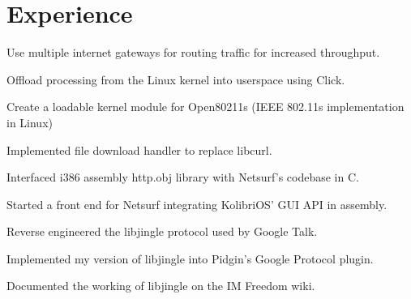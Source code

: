 \documentclass[letterpaper]{deedy-resume} %
\begin{document}
\begin{minipage}[t]{0.66\textwidth} %
\section{Experience}
\vspace{\topsep} %
\begin{tightitemize}
\item Use multiple internet gateways for routing traffic for increased throughput.
\item Offload processing from the Linux kernel into userspace using Click.
\item Create a loadable kernel module for Open80211s (IEEE 802.11s implementation in Linux)
\end{tightitemize}
\sectionspace %
\begin{tightitemize}
\item Implemented file download handler to replace libcurl.
\item Interfaced i386 assembly http.obj library with Netsurf's codebase in C.
\item Started a front end for Netsurf integrating KolibriOS' GUI API in assembly.
\end{tightitemize}
\sectionspace %
\begin{tightitemize}
\item Reverse engineered the libjingle protocol used by Google Talk.
\item Implemented my version of libjingle into Pidgin's Google Protocol plugin.
\item Documented the working of libjingle on the IM Freedom wiki.
\end{tightitemize}
\sectionspace %

\end{minipage}
\end{document}
